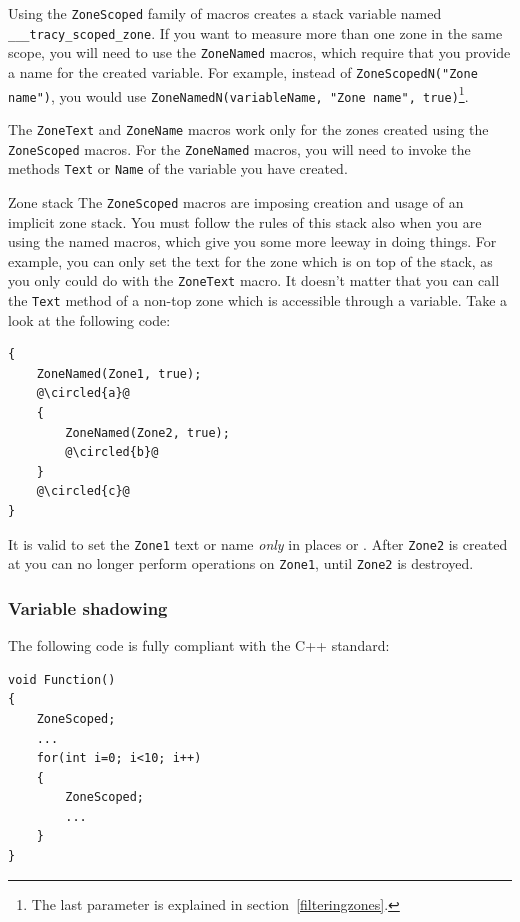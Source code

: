 \documentclass[hidelinks,titlepage,a4paper]{article}
\newcommand*\circled[1]{\tikz[baseline=(char.base)]{
    \node[shape=circle,draw,inner sep=1.5pt] (char) {#1};}}
\begin{document}
Using the \texttt{ZoneScoped} family of macros creates a stack variable named \texttt{\_\_\_tracy\_scoped\_zone}. If you want to measure more than one zone in the same scope, you will need to use the \texttt{ZoneNamed} macros, which require that you provide a name for the created variable. For example, instead of \texttt{ZoneScopedN("Zone name")}, you would use \texttt{ZoneNamedN(variableName, "Zone name", true)}\footnote{The last parameter is explained in section~\ref{filteringzones}.}.

The \texttt{ZoneText} and \texttt{ZoneName} macros work only for the zones created using the \texttt{ZoneScoped} macros. For the \texttt{ZoneNamed} macros, you will need to invoke the methods \texttt{Text} or \texttt{Name} of the variable you have created.

\begin{bclogo}[
noborder=true,
couleur=black!5,
logo=\bcattention
]{Zone stack}
The \texttt{ZoneScoped} macros are imposing creation and usage of an implicit zone stack. You must follow the rules of this stack also when you are using the named macros, which give you some more leeway in doing things. For example, you can only set the text for the zone which is on top of the stack, as you only could do with the \texttt{ZoneText} macro. It doesn't matter that you can call the \texttt{Text} method of a non-top zone which is accessible through a variable. Take a look at the following code:

\begin{lstlisting}
{
	ZoneNamed(Zone1, true);
	@\circled{a}@
	{
		ZoneNamed(Zone2, true);
		@\circled{b}@
	}
	@\circled{c}@
}
\end{lstlisting}

It is valid to set the \texttt{Zone1} text or name \emph{only} in places \circled{a} or \circled{c}. After \texttt{Zone2} is created at \circled{b} you can no longer perform operations on \texttt{Zone1}, until \texttt{Zone2} is destroyed.

\end{bclogo}

\subsubsection{Variable shadowing}

The following code is fully compliant with the C++ standard:

\begin{lstlisting}
void Function()
{
	ZoneScoped;
	...
	for(int i=0; i<10; i++)
	{
		ZoneScoped;
		...
	}
}
\end{lstlisting}
\end{document}
